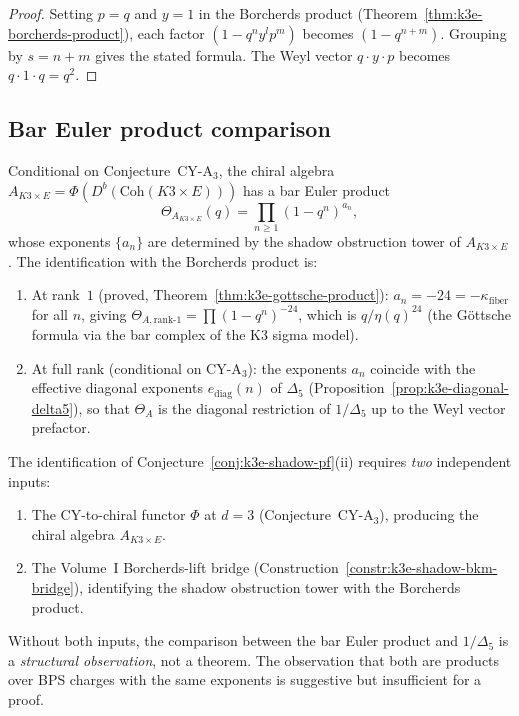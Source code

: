 \begin{proof}
Setting $p = q$ and $y = 1$ in the Borcherds product (Theorem~\ref{thm:k3e-borcherds-product}), each factor $(1 - q^n y^l p^m)$ becomes $(1 - q^{n+m})$. Grouping by $s = n + m$ gives the stated formula. The Weyl vector $q \cdot y \cdot p$ becomes $q \cdot 1 \cdot q = q^2$.
\end{proof}

\subsection{Bar Euler product comparison}
\label{subsec:k3e-bar-euler-comparison}

\begin{conjecture}
\label{conj:k3e-shadow-pf}
\ClaimStatusConjectured
Conditional on Conjecture~CY-A$_3$, the chiral algebra $A_{K3 \times E} = \Phi(D^b(\mathrm{Coh}(K3 \times E)))$ has a bar Euler product
\[
 \Theta_{A_{K3 \times E}}(q) = \prod_{n \geq 1} (1 - q^n)^{a_n},
\]
whose exponents $\{a_n\}$ are determined by the shadow obstruction tower of $A_{K3 \times E}$. The identification with the Borcherds product is:
\begin{enumerate}[label=(\roman*)]
\item At rank~$1$ \textup{(proved, Theorem~\ref{thm:k3e-gottsche-product}):} $a_n = -24 = -\kappa_{\mathrm{fiber}}$ for all $n$, giving $\Theta_{A,\mathrm{rank\text{-}1}} = \prod(1-q^n)^{-24}$, which is $q/\eta(q)^{24}$ (the G\"ottsche formula via the bar complex of the K3 sigma model).
\item At full rank \textup{(conditional on CY-A$_3$):} the exponents $a_n$ coincide with the effective diagonal exponents $e_{\mathrm{diag}}(n)$ of $\Delta_5$ (Proposition~\ref{prop:k3e-diagonal-delta5}), so that $\Theta_A$ is the diagonal restriction of $1/\Delta_5$ up to the Weyl vector prefactor.
\end{enumerate}
\end{conjecture}

\begin{warning}
\label{warn:k3e-borcherds-bar}
The identification of Conjecture~\ref{conj:k3e-shadow-pf}(ii) requires \emph{two} independent inputs:
\begin{enumerate}[label=(\alph*)]
\item The CY-to-chiral functor $\Phi$ at $d = 3$ (Conjecture~CY-A$_3$), producing the chiral algebra $A_{K3 \times E}$.
\item The Volume~I Borcherds-lift bridge (Construction~\ref{constr:k3e-shadow-bkm-bridge}), identifying the shadow obstruction tower with the Borcherds product.
\end{enumerate}
Without both inputs, the comparison between the bar Euler product and $1/\Delta_5$ is a \emph{structural observation}, not a theorem. The observation that both are products over BPS charges with the same exponents is suggestive but insufficient for a proof.
\end{warning}

